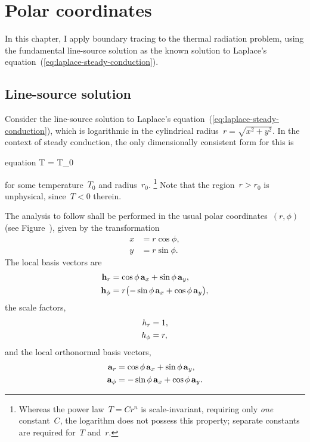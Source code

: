\chapter{Polar coordinates}
\label{ch:polar}

In this chapter, I apply boundary tracing to the thermal radiation problem,
using the fundamental line-source solution
as the known solution to
Laplace's equation~(\ref{eq:laplace-steady-conduction}).

\section{Line-source solution}
\label{sec:polar.line}

Consider the line-source solution
to Laplace's equation~(\ref{eq:laplace-steady-conduction}),
which is logarithmic in the cylindrical radius~$r = \sqrt{x^2 + y^2}$.
In the context of steady conduction,
the only dimensionally consistent form for this is
\begin{important}{equation}
  T = T_0 \log {}
  \label{eq:line-laplace-solution}
\end{important}
for some temperature~$T_0$ and radius~$r_0$.%
\footnote{
  Whereas the power law~$T = C r^n$ is scale-invariant,
  requiring only \emph{one} constant~$C$,
  the logarithm does not possess this property;
  separate constants are required for~$T$ and~$r$.
}
Note that the region~$r > r_0$ is unphysical,
since~$T < 0$ therein.

The analysis to follow shall be performed
in the usual polar coordinates~$(r, \phi)$
(see Figure~\tbd),
given by the transformation
\begin{align}
  x &= r \cos\phi, \label{eq:polar-x-transformation} \\
  y &= r \sin\phi. \label{eq:polar-y-transformation}
\end{align}
The local basis vectors are
\begin{align}
  \localvec{r} &=
    \cos\phi \basisvec{x} + \sin\phi \basisvec{y},
    \label{eq:r-local-basis-vector} \\
  \localvec{\phi} &=
    r \roundbr[\big]{-\sin\phi \basisvec{x} + \cos\phi \basisvec{y}},
    \label{eq:phi-local-basis-vector}
\end{align}
the scale factors,
\begin{align}
  \scalefac[r] &= 1, \label{eq:r-scale-factor} \\
  \scalefac[\phi] &= r, \label{eq:phi-scale-factor}
\end{align}
and the local orthonormal basis vectors,
\begin{align}
  \basisvec{r} &= \cos\phi \basisvec{x} + \sin\phi \basisvec{y},
    \label{eq:r-basis-vector} \\
  \basisvec{\phi} &= -\sin\phi \basisvec{x} + \cos\phi \basisvec{y}.
    \label{eq:phi-basis-vector}
\end{align}

